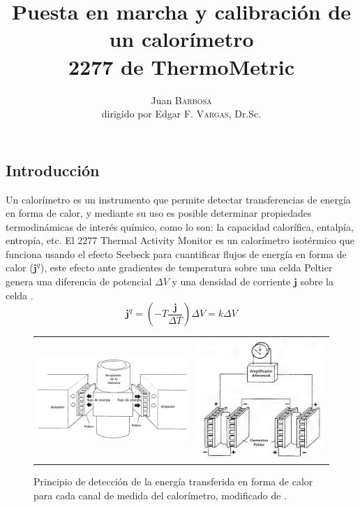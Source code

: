 \documentclass[a0]{sciposter}
\title{Puesta en marcha y calibración de un	calorímetro\\ 2277 de ThermoMetric}
\author{Juan \textsc{Barbosa}\\dirigido por Edgar F. \textsc{Vargas}, Dr.Sc.}
\institute 
{Departamento de Qu\'imica\\
	Universidad de los Andes\\
	Cra 1 N$^\circ$ 18A - 12 Bogotá, Colombia}
\begin{document}
\maketitle

\begin{multicols}{3}

\section{Introducci\'on}
	Un calorímetro es un instrumento que permite detectar transferencias de energ\'ia en forma de calor, y mediante su uso es posible determinar propiedades termodinámicas de interés químico, como lo son: la capacidad calorífica, entalpía, entropía, etc. El 2277 Thermal Activity Monitor es un calorímetro isotérmico que funciona usando el efecto Seebeck para cuantificar flujos de energía en forma de calor ($\mathbf{j}^q$), este efecto ante gradientes de temperatura sobre una celda Peltier genera una diferencia de potencial $\Delta V$ y una densidad de corriente $\mathbf{j}$ sobre la celda \cite{simon2013oxford}.
	\begin{equation}\label{eq: peltier}
		\mathbf{j}^q = \left(-T\dfrac{\mathbf{j}}{\Delta T}\right)\Delta V = k\Delta V
	\end{equation}
	
	\begin{figure}[h]
		\centering
		\begin{tabular}{cc}
			\includegraphics[width=0.59\linewidth]{../Tesis/Figures/heatFlow} & 
			\includegraphics[width=0.39\linewidth]{../Tesis/Figures/twinMeasuring}
		\end{tabular}
		\caption{Principio de detecci\'on de la energ\'ia transferida en forma de calor para cada canal de medida del calor\'imetro, modificado de \cite{Suurkuusk}.}
	\end{figure}


\end{multicols}
\end{document}
